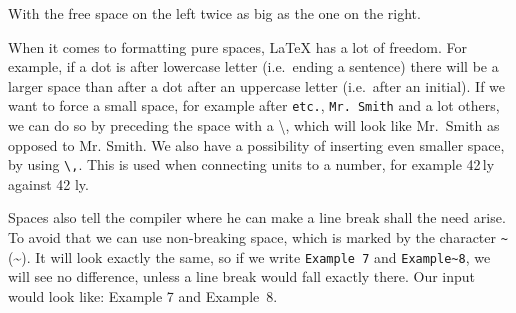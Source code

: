 With the free space on the left twice as big as the one on the right.

When it comes to formatting pure spaces, LaTeX has a lot of freedom. For example, if a dot is after lowercase letter (i.e.\ ending a sentence) there will be a larger space than after a dot after an uppercase letter (i.e.\ after an initial). If we want to force a small space, for example after \verb|etc.|, \verb|Mr. Smith| and a lot others, we can do so by preceding the space with a \textbackslash, which will look like Mr.\ Smith as opposed to Mr. Smith. We also have a possibility of inserting even smaller space, by using \verb|\,|. This is used when connecting units to a number, for example 42\,ly against 42 ly.

Spaces also tell the compiler where he can make a line break shall the need arise. To avoid that we can use non-breaking space, which is marked by the character \verb|~| (\textasciitilde{}). It will look exactly the same, so if we write \verb|Example 7| and \verb|Example~8|, we will see no difference, unless a line break would fall exactly there. Our input would look like: Example 7 and Example~8.